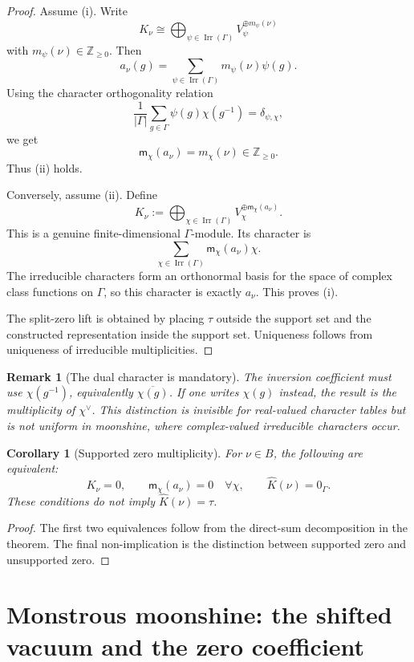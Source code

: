 \documentclass[11pt]{article}
\newtheorem{corollary}[theorem]{Corollary}
\newtheorem{remark}[theorem]{Remark}
\newcommand{\ZZ}{\mathbb Z}
\newcommand{\Irr}{\operatorname{Irr}}
\begin{document}
\begin{proof}
Assume (i).  Write
\[
K_\nu\cong\bigoplus_{\psi\in\Irr(\Gamma)}V_\psi^{\oplus m_\psi(\nu)}
\]
with \(m_\psi(\nu)\in\ZZ_{\ge0}\).  Then
\[
a_\nu(g)=\sum_{\psi\in\Irr(\Gamma)}m_\psi(\nu)\psi(g).
\]
Using the character orthogonality relation
\[
\frac1{|\Gamma|}\sum_{g\in\Gamma}\psi(g)\chi(g^{-1})=\delta_{\psi,\chi},
\]
we get
\[
\mathsf m_\chi(a_\nu)=m_\chi(\nu)\in\ZZ_{\ge0}.
\]
Thus (ii) holds.

Conversely, assume (ii).  Define
\[
K_\nu:=\bigoplus_{\chi\in\Irr(\Gamma)}V_\chi^{\oplus\mathsf m_\chi(a_\nu)}.
\]
This is a genuine finite-dimensional \(\Gamma\)-module.  Its character is
\[
\sum_{\chi\in\Irr(\Gamma)}\mathsf m_\chi(a_\nu)\chi.
\]
The irreducible characters form an orthonormal basis for the space of complex class functions on \(\Gamma\), so this character is exactly \(a_\nu\).  This proves (i).

The split-zero lift is obtained by placing \(\tau\) outside the support set and the constructed representation inside the support set.  Uniqueness follows from uniqueness of irreducible multiplicities.
\end{proof}

\begin{remark}[The dual character is mandatory]
The inversion coefficient must use \(\chi(g^{-1})\), equivalently \(\overline{\chi(g)}\).  If one writes \(\chi(g)\) instead, the result is the multiplicity of \(\chi^\vee\).  This distinction is invisible for real-valued character tables but is not uniform in moonshine, where complex-valued irreducible characters occur.
\end{remark}

\begin{corollary}[Supported zero multiplicity]
For \(\nu\in B\), the following are equivalent:
\[
K_\nu=0,
\qquad
\mathsf m_\chi(a_\nu)=0\quad\forall\chi,
\qquad
\widehat K(\nu)=0_\Gamma.
\]
These conditions do not imply \(\widehat K(\nu)=\tau\).
\end{corollary}

\begin{proof}
The first two equivalences follow from the direct-sum decomposition in the theorem.  The final non-implication is the distinction between supported zero and unsupported zero.
\end{proof}

\section{Monstrous moonshine: the shifted vacuum and the zero coefficient}
\end{document}

